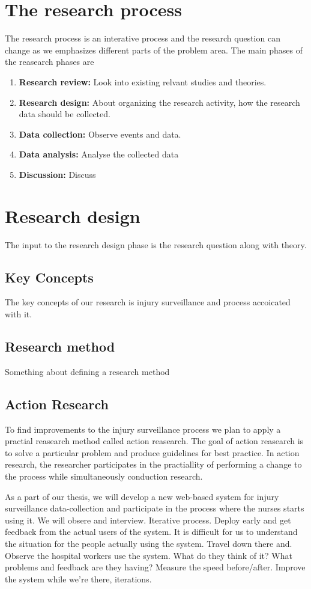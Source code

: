 \documentclass[UKenglish, 12pt]{article}
\begin{document}
 \section*{The research process}
 The research process is an interative process and the research question can change as we emphasizes different parts of the problem area. The main phases of the reasearch phases are
 \begin{enumerate}
 \item \textbf{Research review:} Look into existing relvant studies and theories.
 \item \textbf{Research design:} About organizing the research activity, how the research data should be collected.
 \item \textbf{Data collection:} Observe events and data.
 \item \textbf{Data analysis:} Analyse the collected data
 \item \textbf{Discussion:} Discuss
 \end{enumerate}

\section*{Research design}
The input to the research design phase is the research question along with theory.

\subsection*{Key Concepts}
The key concepts of our research is injury surveillance and process accoicated with it.

\subsection*{Research method}
Something about defining a research method
\subsection*{Action Research}
To find improvements to the injury surveillance process we plan to apply a practial reasearch method called action reasearch. The goal of action reasearch is to solve a particular problem and produce guidelines for best practice\cite{denscombe}. In action research, the researcher participates in the practiallity of performing a change to the process while simultaneously conduction research.

As a part of our thesis, we will develop a new web-based system for injury surveillance data-collection and participate in the process where the nurses starts using it. We will obsere and interview. Iterative process. Deploy early and get feedback from the actual users of the system. It is difficult for us to understand the situation for the people actually using the system. Travel down there and. Observe the hospital workers use the system. What do they think of it? What problems and feedback are they having? Measure the speed before/after. Improve the system while we're there, iterations.
\end{document}
